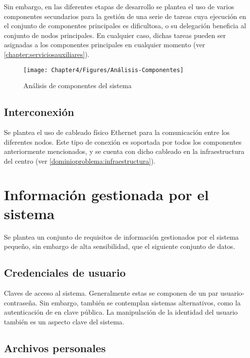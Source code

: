 Sin embargo, en las diferentes etapas de desarrollo se plantea el uso de varios componentes secundarios para la gestión de una serie de tareas cuya ejecución en el conjunto de componentes principales es dificultosa, o su delegación beneficia al conjunto de nodos principales. En cualquier caso, dichas tareas pueden ser asignadas a los componentes principales en cualquier momento (ver \ref{chapter:serviciosauxiliares}).

\begin{figure}[H]
	\centering
	\texttt{[image: Chapter4/Figures/Análisis-Componentes]}
	\caption[Análisis de componentes]{Análisis de componentes del sistema}
	\label{analisis:componentes}
\end{figure}

\subsection{Interconexión}

Se plantea el uso de cableado físico Ethernet para la comunicación entre los diferentes nodos. Este tipo de conexión es soportada por todos los componentes anteriormente mencionados, y se cuenta con dicho cableado en la infraestructura del centro (ver \ref{dominioproblema:infraestructura}).

\section{Información gestionada por el sistema}

Se plantea un conjunto de requisitos de información gestionados por el sistema pequeño, sin embargo de alta sensibilidad, que el siguiente conjunto de datos.

\subsection{Credenciales de usuario}

Claves de acceso al sistema. Generalmente estas se componen de un par usuario-contraseña. Sin embargo, también se contemplan sistemas alternativos, como la autenticación de en clave pública. La manipulación de la identidad del usuario también es un aspecto clave del sistema.

\subsection{Archivos personales}

